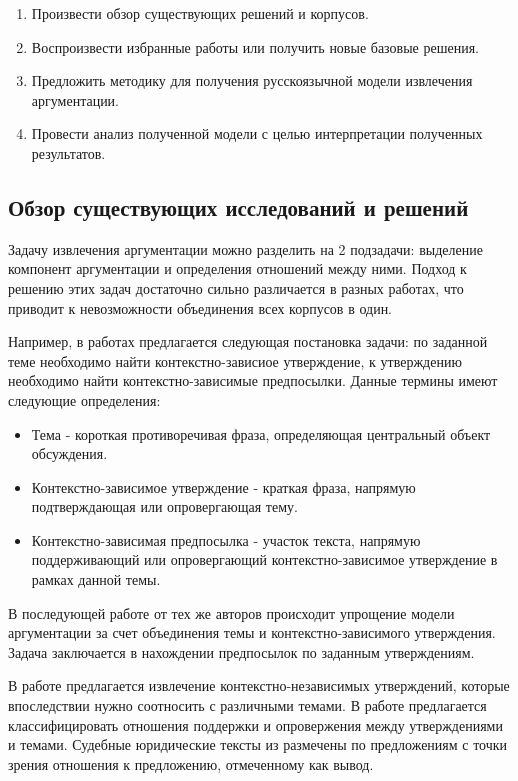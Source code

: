 \begin{enumerate}
	\item Произвести обзор существующих решений и корпусов.
    \item Воспроизвести избранные работы или получить новые базовые решения.
    \item Предложить методику для получения русскоязычной модели извлечения аргументации.
    \item Провести анализ полученной модели с целью интерпретации полученных результатов.
\end{enumerate}


\subsection{Обзор существующих исследований и  решений}
Задачу извлечения аргументации можно разделить на 2 подзадачи: выделение компонент аргументации и определения отношений между ними. Подход к решению этих задач достаточно сильно различается в разных работах, что приводит к невозможности объединения всех корпусов в один.

Например, в работах \cite{aharoni2014benchmark, rinott2015show, levy2018towards} предлагается следующая постановка задачи: по заданной теме необходимо найти контекстно-зависиое утверждение, к утверждению необходимо найти контекстно-зависимые предпосылки. Данные термины имеют следующие определения:
\begin{itemize}
    \item Тема - короткая противоречивая фраза, определяющая центральный объект обсуждения.
    \item Контекстно-зависимое утверждение - краткая фраза, напрямую подтверждающая или опровергающая тему.
    \item Контекстно-зависимая предпосылка - участок текста, напрямую поддерживающий или опровергающий контекстно-зависимое утверждение в рамках данной темы.
\end{itemize}

В последующей работе от тех же авторов \cite{ein2020corpus} происходит упрощение модели аргументации за счет объединения темы и контекстно-зависимого утверждения. Задача заключается в нахождении предпосылок по заданным утверждениям.

В работе \cite{lippi2015context} предлагается извлечение контекстно-независимых утверждений, которые впоследствии нужно соотносить с различными темами. В работе \cite{bar2017stance} предлагается классифицировать отношения поддержки и опровержения между утверждениями и темами. Судебные юридические тексты из \cite{palau2009argumentation} размечены по предложениям с точки зрения отношения к предложению, отмеченному как вывод.

